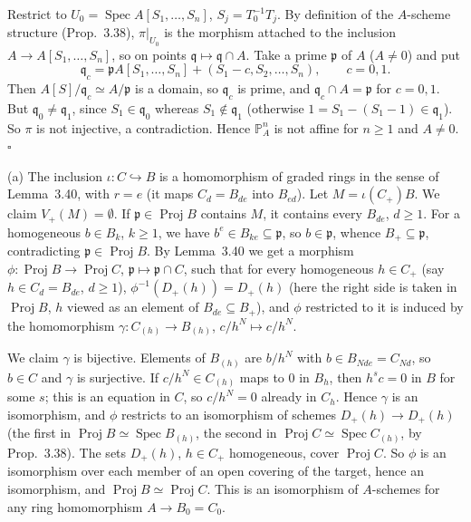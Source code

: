 \documentclass[11pt]{article}
\begin{document}
Restrict to $U_0=\operatorname{Spec}A[S_1,\dots,S_n]$, $S_j=T_0^{-1}T_j$. By definition of the $A$-scheme structure (Prop.~3.38), $\pi|_{U_0}$ is the morphism attached to the inclusion $A\to A[S_1,\dots,S_n]$, so on points $\mathfrak{q}\mapsto\mathfrak{q}\cap A$. Take a prime $\mathfrak{p}$ of $A$ ($A\neq0$) and put
\[ \mathfrak{q}_c=\mathfrak{p}A[S_1,\dots,S_n]+(S_1-c,S_2,\dots,S_n),\qquad c=0,1. \]
Then $A[S]/\mathfrak{q}_c\simeq A/\mathfrak{p}$ is a domain, so $\mathfrak{q}_c$ is prime, and $\mathfrak{q}_c\cap A=\mathfrak{p}$ for $c=0,1$. But $\mathfrak{q}_0\neq\mathfrak{q}_1$, since $S_1\in\mathfrak{q}_0$ whereas $S_1\notin\mathfrak{q}_1$ (otherwise $1=S_1-(S_1-1)\in\mathfrak{q}_1$). So $\pi$ is not injective, a contradiction. Hence $\mathbb{P}^n_A$ is not affine for $n\geq1$ and $A\neq0$. \hfill$\square$

\pf
(a) The inclusion $\iota:C\hookrightarrow B$ is a homomorphism of graded rings in the sense of Lemma~3.40, with $r=e$ (it maps $C_d=B_{de}$ into $B_{ed}$). Let $M=\iota(C_+)B$. We claim $V_+(M)=\emptyset$. If $\mathfrak{p}\in\operatorname{Proj}B$ contains $M$, it contains every $B_{de}$, $d\geq1$. For a homogeneous $b\in B_k$, $k\geq1$, we have $b^e\in B_{ke}\subseteq\mathfrak{p}$, so $b\in\mathfrak{p}$, whence $B_+\subseteq\mathfrak{p}$, contradicting $\mathfrak{p}\in\operatorname{Proj}B$. By Lemma~3.40 we get a morphism $\phi:\operatorname{Proj}B\to\operatorname{Proj}C$, $\mathfrak{p}\mapsto\mathfrak{p}\cap C$, such that for every homogeneous $h\in C_+$ (say $h\in C_d=B_{de}$, $d\geq1$), $\phi^{-1}(D_+(h))=D_+(h)$ (here the right side is taken in $\operatorname{Proj}B$, $h$ viewed as an element of $B_{de}\subseteq B_+$), and $\phi$ restricted to it is induced by the homomorphism $\gamma:C_{(h)}\to B_{(h)}$, $c/h^N\mapsto c/h^N$.

We claim $\gamma$ is bijective. Elements of $B_{(h)}$ are $b/h^N$ with $b\in B_{Nde}=C_{Nd}$, so $b\in C$ and $\gamma$ is surjective. If $c/h^N\in C_{(h)}$ maps to $0$ in $B_h$, then $h^sc=0$ in $B$ for some $s$; this is an equation in $C$, so $c/h^N=0$ already in $C_h$. Hence $\gamma$ is an isomorphism, and $\phi$ restricts to an isomorphism of schemes $D_+(h)\to D_+(h)$ (the first in $\operatorname{Proj}B\simeq\operatorname{Spec}B_{(h)}$, the second in $\operatorname{Proj}C\simeq\operatorname{Spec}C_{(h)}$, by Prop.~3.38). The sets $D_+(h)$, $h\in C_+$ homogeneous, cover $\operatorname{Proj}C$. So $\phi$ is an isomorphism over each member of an open covering of the target, hence an isomorphism, and $\operatorname{Proj}B\simeq\operatorname{Proj}C$. This is an isomorphism of $A$-schemes for any ring homomorphism $A\to B_0=C_0$.
\end{document}
